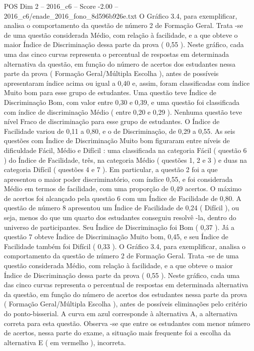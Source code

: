 \begin{textsample}{POS Dim 2 – 2016\_c6 – Score -2.00 – 2016\_c6/enade\_2016\_fono\_8d596b926e.txt}
O Gráfico 3.4, para exemplificar, analisa o comportamento da questão de número 2 de Formação Geral.
Trata -se de uma questão considerada Médio, com relação à facilidade, e a que obteve o maior Índice de Discriminação dessa parte da prova ( 0,55 ).
Neste gráfico, cada uma das cinco curvas representa o percentual de respostas em determinada alternativa da questão, em função do número de acertos dos estudantes nessa parte da prova ( Formação Geral/Múltipla Escolha ), antes de possíveis apresentaram índice acima ou igual a 0,40 e, assim, foram classificadas com índice Muito bom para esse grupo de estudantes.
Uma questão teve Índice de Discriminação Bom, com valor entre 0,30 e 0,39, e uma questão foi classificada com índice de discriminação Médio ( entre 0,20 e 0,29 ).
Nenhuma questão teve nível Fraco de discriminação para esse grupo de estudantes.
O Índice de Facilidade variou de 0,11 a 0,80, e o de Discriminação, de 0,29 a 0,55.
As seis questões com Índice de Discriminação Muito bom figuraram entre níveis de dificuldade Fácil, Médio e Difícil : uma classificada na categoria Fácil ( questão 6 ) do Índice de Facilidade, três, na categoria Médio ( questões 1, 2 e 3 ) e duas na categoria Difícil ( questões 4 e 7 ).
Em particular, a questão 2 foi a que apresentou o maior poder discriminatório, com índice 0,55, e foi considerada Médio em termos de facilidade, com uma proporção de 0,49 acertos.
O máximo de acertos foi alcançado pela questão 6 com um Índice de Facilidade de 0,80.
A questão de número 8 apresentou um Índice de Facilidade de 0,24 ( Difícil ), ou seja, menos do que um quarto dos estudantes conseguiu resolvê -la, dentro do universo de participantes.
Seu Índice de Discriminação foi Bom ( 0,37 ).
Já a questão 7 obteve Índice de Discriminação Muito bom, 0,45, e seu Índice de Facilidade também foi Difícil ( 0,33 ).
O Gráfico 3.4, para exemplificar, analisa o comportamento da questão de número 2 de Formação Geral.
Trata -se de uma questão considerada Médio, com relação à facilidade, e a que obteve o maior Índice de Discriminação dessa parte da prova ( 0,55 ).
Neste gráfico, cada uma das cinco curvas representa o percentual de respostas em determinada alternativa da questão, em função do número de acertos dos estudantes nessa parte da prova ( Formação Geral/Múltipla Escolha ), antes de possíveis eliminações pelo critério do ponto-bisserial.
A curva em azul corresponde à alternativa A, a alternativa correta para esta questão.
Observa -se que entre os estudantes com menor número de acertos, nessa parte do exame, a situação mais frequente foi a escolha da alternativa E ( em vermelho ), incorreta.

\end{textsample}
